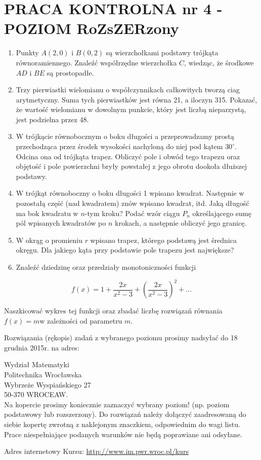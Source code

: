 \documentclass[10pt]{article}
\begin{document}
\section*{PRACA KONTROLNA nr 4 - POZIOM RoZsZERzony}
\begin{enumerate}
  \item Punkty $A(2,0)$ i $B(0,2)$ są wierzchołkami podstawy trójkąta równoramiennego. Znaleźć współrzędne wierzchołka $C$, wiedząc, że środkowe $A D$ i $B E$ są prostopadłe.
  \item Trzy pierwiastki wielomianu o współczynnikach całkowitych tworzą ciag arytmetyczny. Suma tych pierwiastków jest równa 21, a iloczyn 315. Pokazać, że wartość wielomianu w dowolnym punkcie, który jest liczbą nieparzystą, jest podzielna przez 48.
  \item W trójkącie równobocznym o boku długości a przeprowadzamy prostą przechodząca przez środek wysokości nachyloną do niej pod kątem $30^{\circ}$. Odcina ona od trójkąta trapez. Obliczyć pole i obwód tego trapezu oraz objętość i pole powierzchni bryły powstałej z jego obrotu dookoła dłuższej podstawy.
  \item W trójkąt równoboczny o boku długości 1 wpisano kwadrat. Następnie w pozostałą część (nad kwadratem) znów wpisano kwadrat, itd. Jaką długość ma bok kwadratu w $n$-tym kroku? Podać wzór ciągu $P_{n}$ określającego sumę pól wpisanych kwadratów po $n$ krokach, a następnie obliczyć jego granicę.
  \item W okrąg o promieniu $r$ wpisano trapez, którego podstawą jest średnica okręgu. Dla jakiego kąta przy podstawie pole trapezu jest największe?
  \item Znaleźć dziedzinę oraz przedziały monotoniczności funkcji
\end{enumerate}

$$
f(x)=1+\frac{2 x}{x^{2}-3}+\left(\frac{2 x}{x^{2}-3}\right)^{2}+\ldots
$$

Naszkicować wykres tej funkcji oraz zbadać liczbę rozwiązań równania $f(x)=m \mathrm{w}$ zależności od parametru $m$.

Rozwiązania (rękopis) zadań z wybranego poziomu prosimy nadsyłać do 18 grudnia 2015r. na adres:

Wydział Matematyki\\
Politechnika Wrocławska\\
Wybrzeże Wyspiańskiego 27\\
50-370 WROCEAW.\\
Na kopercie prosimy koniecznie zaznaczyć wybrany poziom! (np. poziom podstawowy lub rozszerzony). Do rozwiązań należy dołączyć zaadresowaną do siebie kopertę zwrotną z naklejonym znaczkiem, odpowiednim do wagi listu. Prace niespełniające podanych warunków nie będą poprawiane ani odsyłane.

Adres internetowy Kursu: \href{http://www.im.pwr.wroc.pl/kurs}{http://www.im.pwr.wroc.pl/kurs}
\end{document}
